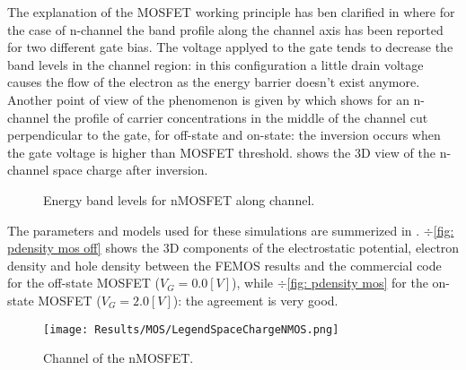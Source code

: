 The explanation of the MOSFET working principle has ben clarified in  where for the case of n-channel the band profile along the channel axis has been reported for two different gate bias.
The voltage applyed to the gate tends to decrease the band levels in the channel region: in this configuration a little drain voltage causes the flow of the electron as the energy barrier doesn't exist anymore.
Another point of view of the phenomenon is given by  which shows for an n-channel the profile of carrier concentrations in the middle of the channel cut perpendicular to the gate, for off-state and on-state: the inversion occurs when the gate voltage is higher than MOSFET threshold.
 shows the 3D view of the n-channel space charge after inversion.



\begin{figure}[!t]
\centering
{}
\caption{Energy band levels for nMOSFET along channel.}
\label{fig: energy levels MOS}
\end{figure}



The parameters and models used for these simulations are summerized in . $\div$\ref{fig: pdensity mos off} shows the 3D components of the electrostatic potential, electron density and hole density between the FEMOS results and the commercial code for the off-state MOSFET ($V_G=0.0[V]$), while $\div$\ref{fig: pdensity mos} for the on-state MOSFET ($V_G=2.0[V]$): the agreement is very good.


\begin{figure}[!b]
\centering
{}
\hspace{0.06\textwidth}
\hspace{0.04\textwidth}
{\texttt{[image: Results/MOS/LegendSpaceChargeNMOS.png]}}
\caption{Channel of the nMOSFET.}
\label{fig: channel figures}
\end{figure}


